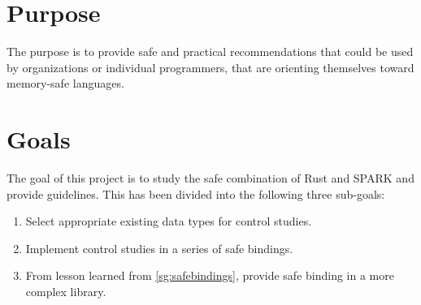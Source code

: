 \documentclass[nomenclature, english, bibtex]{kththesis}
\newcommand*{\generalExpl}[1]{\todo[inline]{#1}}
\newcommand*{\sweExpl}[1]{\todo[inline, backgroundcolor=kth-lightblue40]{#1}}  %
\begin{document}
\section{Purpose}

The purpose is to provide safe and practical recommendations that could be used by organizations or individual programmers, that are orienting themselves toward memory-safe languages.

\section{Goals}


The goal of this project is to study the safe combination of Rust and SPARK and provide guidelines. This has been divided into the following three sub-goals:

\begin{enumerate}[leftmargin=*, label=\textbf{Subgoal \arabic*}, ref={Subgoal \arabic*}]
\item\label{sg:selectdatatypes} Select appropriate existing data types for control studies.
\item\label{sg:safebindings} Implement control studies in a series of safe bindings.
\item\label{sg:providesafebindings} From lesson learned from \ref{sg:safebindings}, provide safe binding in a more complex library.
\end{enumerate}
\end{document}
